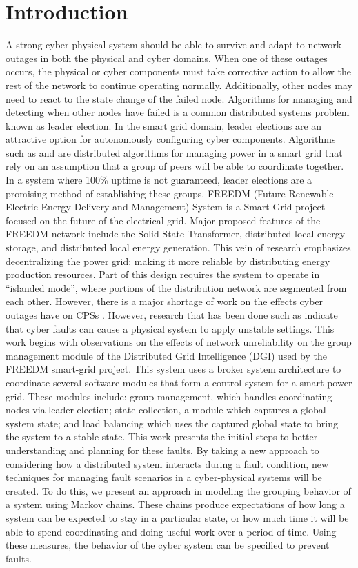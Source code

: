 \chapter{Introduction}
A strong cyber-physical system should be able to survive and adapt to network outages in both the physical and cyber domains. When one of these outages occurs, the physical or cyber components must take corrective action to allow the rest of the network to continue operating normally. Additionally, other nodes may need to react to the state change of the failed node. Algorithms for managing and detecting when other nodes have failed is a common distributed systems problem known as leader election.
In the smart grid domain, leader elections are an attractive option for autonomously configuring cyber components. Algorithms such as \cite{LOADBALANCING} and \cite{INCREMENTALCONSENSUS} are distributed algorithms for managing power in a smart grid that rely on an assumption that a group of peers will be able to coordinate together. In a system where 100\% uptime is not guaranteed, leader elections are a promising method of establishing these groups.
FREEDM (Future Renewable Electric Energy Delivery and Management) System is a Smart Grid project focused on the future of the electrical grid. Major proposed features of the FREEDM network include the Solid State Transformer, distributed local energy storage, and distributed local energy generation\cite{FREEDMMIGRATION}. This vein of research emphasizes decentralizing the power grid: making it more reliable by distributing energy production resources. Part of this design requires the system to operate in “islanded mode”, where portions of the distribution network are segmented from each other. However, there is a major shortage of work on the effects cyber outages have on CPSs \cite{CYBERRESEARCHCALL} \cite{SMARTGRIDBENEFITS}. However, research that has been done such as \cite{HARINI} indicate that cyber faults can cause a physical system to apply unstable settings.
This work begins with observations on the effects of network unreliability on the group management module of the Distributed Grid Intelligence (DGI) used by the FREEDM smart-grid project. This system uses a broker system architecture to coordinate several software modules that form a control system for a smart power grid. These modules include: group management, which handles coordinating nodes via leader election; state collection, a module which captures a global system state; and load balancing which uses the captured global state to bring the system to a stable state.
This work presents the initial steps to better understanding and planning for these faults. By taking a new approach to considering how a distributed system interacts during a fault condition, new techniques for managing fault scenarios in a cyber-physical systems will be created. To do this, we present an approach in modeling the grouping behavior of a system using Markov chains. These chains produce expectations of how long a system can be expected to stay in a particular state, or how much time it will be able to spend coordinating and doing useful work over a period of time. Using these measures, the behavior of the cyber system can be specified to prevent faults.
